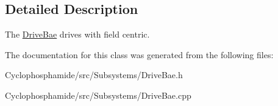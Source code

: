 \subsection{Detailed Description}
The \hyperlink{class_drive_bae}{Drive\+Bae} drives with field centric. 

The documentation for this class was generated from the following files\+:\begin{DoxyCompactItemize}
\item 
Cyclophosphamide/src/\+Subsystems/Drive\+Bae.\+h\item 
Cyclophosphamide/src/\+Subsystems/Drive\+Bae.\+cpp\end{DoxyCompactItemize}
